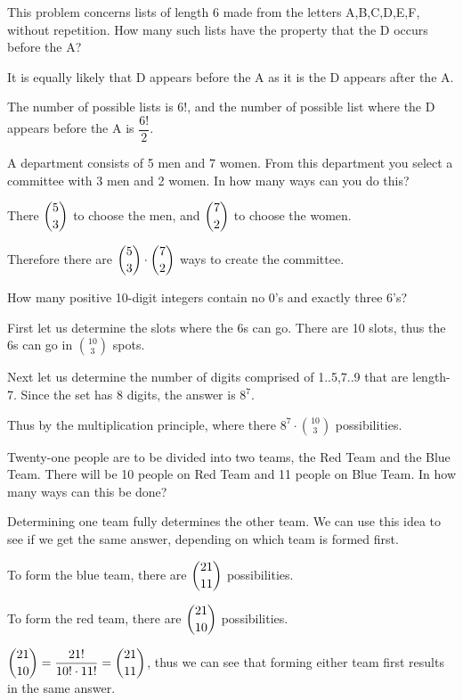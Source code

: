 \documentclass[openany, 12pt]{book}
\begin{document}
\begin{exercise}{}{}
	This problem concerns lists of length 6 made from the
	letters A,B,C,D,E,F, without repetition. How many such lists have the
	property that the D occurs before the A?
	\begin{alist}
		\item It is equally likely that D appears before the A as it is the D appears
		after the A.
		\item The number of possible lists is $6!$, and the number of possible list
		where the D appears before the A is $\dfrac{6!}{2}$.
	\end{alist}
\end{exercise}

\begin{exercise}{}{}
	A department consists of 5 men and 7 women. From this
	department you select a committee with 3 men and 2 women. In how many ways
	can you do this?
	\begin{alist}
		\item There $\dbinom{5}{3}$ to choose the men, and $\dbinom{7}{2}$ to choose the
		women.
		\item Therefore there are $\dbinom{5}{3}\cdot \dbinom{7}{2}$ ways to create the
		committee.
	\end{alist}
\end{exercise}

\begin{exercise}{}{}
	How many positive 10-digit integers contain no 0's and exactly three 6's?
	\begin{alist}
		\item First let us determine the slots where the 6s can go. There are 10 slots,
		thus the 6s can go in $\binom{10}{3}$ spots.
		\item Next let us determine the number of digits comprised of 1..5,7..9 that
		are length-7. Since the set has 8 digits, the answer is $8^7$.
		\item Thus by the multiplication principle, where there
		$8^{7}\cdot\binom{10}{3}$ possibilities.
	\end{alist}
\end{exercise}

\begin{exercise}{}{}
	Twenty-one people are to be divided into two teams, the
	Red Team and the Blue Team. There will be 10 people on Red Team and 11
	people on Blue Team. In how many ways can this be done?
	\begin{alist}
		\item Determining one team fully determines the other team. We can use this idea
		to see if we get the same answer, depending on which team is formed first.
		\item To form the blue team, there are $\dbinom{21}{11}$ possibilities.
		\item To form the red team, there are $\dbinom{21}{10}$ possibilities.
		\item $\dbinom{21}{10} = \dfrac{21!}{10!\cdot11!} = \dbinom{21}{11}$, thus we
		can see that forming either team first results in the same answer.
	\end{alist}
\end{exercise}
\end{document}
